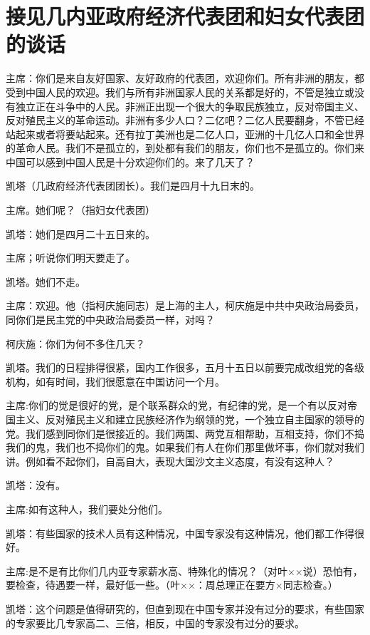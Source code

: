 \section[接见几内亚政府经济代表团和妇女代表团的谈话（一九六二年五月三日）]{接见几内亚政府经济代表团和妇女代表团的谈话}


主席：你们是来自友好国家、友好政府的代表团，欢迎你们。所有非洲的朋友，都受到中国人民的欢迎。我们与所有非洲国家人民的关系都是好的，不管是独立或没有独立正在斗争中的人民。非洲正出现一个很大的争取民族独立，反对帝国主义、反对殖民主义的革命运动。非洲有多少人口？二亿吧？二亿人民要翻身，不管已经站起来或者将要站起来。还有拉丁美洲也是二亿人口，亚洲的十几亿人口和全世界的革命人民。我们不是孤立的，到处都有我们的朋友，你们也不是孤立的。你们来中国可以感到中国人民是十分欢迎你们的。来了几天了？

凯塔（几政府经济代表团团长）。我们是四月十九日末的。

主席。她们呢？（指妇女代表团）

凯塔：她们是四月二十五日来的。

主席；听说你们明天要走了。

凯塔。她们不走。

主席：欢迎。他（指柯庆施同志）是上海的主人，柯庆施是中共中央政治局委员，同你们是民主党的中央政治局委员一样，对吗？

柯庆施：你们为何不多住几天？

凯塔。我们的日程排得很紧，国内工作很多，五月十五日以前要完成改组党的各级机构，如有时间，我们很愿意在中国访问一个月。

主席:你们的觉是很好的党，是个联系群众的党，有纪律的党，是一个有以反对帝国主义、反对殖民主义和建立民族经济作为纲领的党，一个独立自主国家的领导的党。我们感到同你们是很接近的。我们两国、两党互相帮助，互相支持，你们不捣我们的鬼，我们也不捣你们的鬼。如果我们有人在你们那里做坏事，你们就对我们讲。例如看不起你们，自高自大，表现大国沙文主义态度，有没有这种人？

凯塔：没有。

主席:如有这种人，我们要处分他们。

凯塔：有些国家的技术人员有这种情况，中国专家没有这种情况，他们都工作得很好。

主席:是不是有比你们几内亚专家薪水高、特殊化的情况？（对叶××说）恐怕有，要检查，待遇要一样，最好低一些。（叶××：周总理正在要方×同志检查。）

凯塔：这个问题是值得研究的，但直到现在中国专家并没有过分的要求，有些国家的专家要比几专家高二、三倍，相反，中国的专家没有过分的要求。

